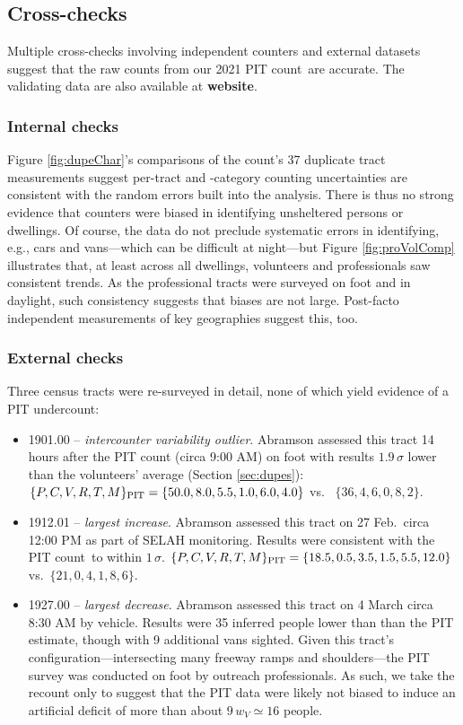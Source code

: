 \documentclass[11pt,twocolumn]{article}
\def\bfr{\bf\color{red}}
\def\Count{count}
\begin{document}
\subsection{Cross-checks}
\label{sec:crossChecks}

Multiple cross-checks involving independent counters and external datasets suggest 
that the raw counts from our 2021 PIT \Count\ are accurate. The validating data are also
available at {\bfr website}.

\subsubsection{Internal checks}

Figure \ref{fig:dupeChar}'s comparisons of the count's 37 duplicate tract measurements suggest 
per-tract and -category counting uncertainties are consistent with the random errors built into the analysis. 
There is thus no strong evidence that counters were biased in identifying unsheltered persons or dwellings. 
Of course, the data do not preclude systematic errors in identifying, e.g., cars and 
vans---which can be difficult at night---but Figure \ref{fig:proVolComp} illustrates that, at least across all
dwellings, volunteers and professionals saw consistent trends. As the professional tracts were surveyed 
on foot and in daylight, such consistency suggests that biases are not large. Post-facto independent 
measurements of key geographies suggest this, too.

\subsubsection{External checks}

Three census tracts were re-surveyed in detail, none of which yield evidence of a PIT undercount:
\begin{itemize}
	\item 1901.00 -- {\it intercounter variability outlier}. Abramson
		  assessed this tract 14 hours after the PIT count (circa 9:00 AM) on foot with results 
		  $1.9\,\sigma$ lower than the volunteers' average (Section \ref{sec:dupes}):
		  $\{P,C,V,R,T,M\}_{\rm PIT} = \{50.0, 8.0, 5.5, 1.0, 6.0, 4.0\}$ vs.~
		$\{36, 4, 6, 0, 8, 2\}$.
	\item 1912.01 -- {\it largest increase}. Abramson assessed this tract on 
		27 Feb.\ circa 12:00 PM as part of SELAH monitoring. Results were consistent with 
		the PIT \Count\ to within $1\,\sigma$. $\{P,C,V,R,T,M\}_{\rm PIT}=\{18.5,0.5, 3.5, 1.5, 5.5, 12.0\}$ 
		vs.~$\{21,0,4,1,8,6\}$.
	\item 1927.00 -- {\it largest decrease}. Abramson assessed this tract
		on 4 March circa 8:30 AM by vehicle. Results were 35 inferred people lower than than the PIT 
		estimate, though with 9 additional vans sighted. Given this tract's configuration---intersecting 
		many freeway ramps and shoulders---the PIT survey was conducted on foot by outreach professionals. 
		As such, we take the recount only to suggest that the PIT data were likely not biased to induce an 
		artificial deficit of more than about $9\,w_{V}\simeq 16$ people.
\end{itemize}
\end{document}
